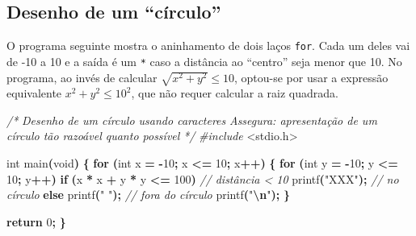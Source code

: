 \documentclass[
  11pt,
  a4paper,
]{scrbook}
\newenvironment{Shaded}{\begin{snugshade}}{\end{snugshade}}
\newcommand{\CommentTok}[1]{\textcolor[rgb]{0.56,0.35,0.01}{\textit{#1}}}
\newcommand{\ControlFlowTok}[1]{\textcolor[rgb]{0.13,0.29,0.53}{\textbf{#1}}}
\newcommand{\DataTypeTok}[1]{\textcolor[rgb]{0.13,0.29,0.53}{#1}}
\newcommand{\DecValTok}[1]{\textcolor[rgb]{0.00,0.00,0.81}{#1}}
\newcommand{\ImportTok}[1]{#1}
\newcommand{\NormalTok}[1]{#1}
\newcommand{\OperatorTok}[1]{\textcolor[rgb]{0.81,0.36,0.00}{\textbf{#1}}}
\newcommand{\PreprocessorTok}[1]{\textcolor[rgb]{0.56,0.35,0.01}{\textit{#1}}}
\newcommand{\SpecialCharTok}[1]{\textcolor[rgb]{0.81,0.36,0.00}{\textbf{#1}}}
\newcommand{\StringTok}[1]{\textcolor[rgb]{0.31,0.60,0.02}{#1}}
\begin{document}
\subsection{Desenho de um ``círculo''}\label{desenho-de-um-cuxedrculo}

O programa seguinte mostra o aninhamento de dois laços \texttt{for}.
Cada um deles vai de -10 a 10 e a saída é um \texttt{*} caso a distância
ao ``centro'' seja menor que 10. No programa, ao invés de calcular
\({\sqrt{x^2 + y^2} \leq 10}\), optou-se por usar a expressão
equivalente \({x^2 + y^2 \leq 10^2}\), que não requer calcular a raiz
quadrada.

\begin{Shaded}
\begin{Highlighting}[]
\CommentTok{/*}
\CommentTok{Desenho de um círculo usando caracteres}
\CommentTok{Assegura: apresentação de um círculo tão razoável quanto possível}
\CommentTok{*/}
\PreprocessorTok{\#include }\ImportTok{\textless{}stdio.h\textgreater{}}

\DataTypeTok{int}\NormalTok{ main}\OperatorTok{(}\DataTypeTok{void}\OperatorTok{)} \OperatorTok{\{}
    \ControlFlowTok{for} \OperatorTok{(}\DataTypeTok{int}\NormalTok{ x }\OperatorTok{=} \OperatorTok{{-}}\DecValTok{10}\OperatorTok{;}\NormalTok{ x }\OperatorTok{\textless{}=} \DecValTok{10}\OperatorTok{;}\NormalTok{ x}\OperatorTok{++)} \OperatorTok{\{}
        \ControlFlowTok{for} \OperatorTok{(}\DataTypeTok{int}\NormalTok{ y }\OperatorTok{=} \OperatorTok{{-}}\DecValTok{10}\OperatorTok{;}\NormalTok{ y }\OperatorTok{\textless{}=} \DecValTok{10}\OperatorTok{;}\NormalTok{ y}\OperatorTok{++)}
            \ControlFlowTok{if} \OperatorTok{(}\NormalTok{x }\OperatorTok{*}\NormalTok{ x }\OperatorTok{+}\NormalTok{ y }\OperatorTok{*}\NormalTok{ y }\OperatorTok{\textless{}=} \DecValTok{100}\OperatorTok{)}  \CommentTok{// distância \textless{} 10}
\NormalTok{                printf}\OperatorTok{(}\StringTok{"XXX"}\OperatorTok{);}  \CommentTok{// no círculo}
            \ControlFlowTok{else}
\NormalTok{                printf}\OperatorTok{(}\StringTok{"   "}\OperatorTok{);}  \CommentTok{// fora do círculo}
\NormalTok{        printf}\OperatorTok{(}\StringTok{"}\SpecialCharTok{\textbackslash{}n}\StringTok{"}\OperatorTok{);}
    \OperatorTok{\}}

    \ControlFlowTok{return} \DecValTok{0}\OperatorTok{;}
\OperatorTok{\}}
\end{Highlighting}
\end{Shaded}
\end{document}
